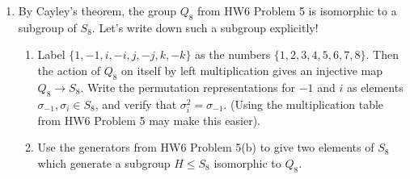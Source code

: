 \documentclass[11pt]{article}
\newtheorem*{hint}{Hint}
\begin{document}
\begin{enumerate}
{\begin{enumerate}
\[\begin{array}{c}
      \text{such that }N\le H
    \end{array}\right\}
    \Longleftrightarrow
    \left\{
    \begin{array}{c}
      \text{Subgroups}\\
      \overline{H}\le G/N
    \end{array}
    \right\}
    \]
  \item This bijection satisfies certain properties.  First let's establish some notation. Let $H,K\in G$ be two subgroups containing $N$, and denote the corresponding subgroups of $G/N$ by $\overline H$ and $\overline K$.  Prove the following properties.
    \begin{enumerate}
      \item $H\le K$ if and only if $\overline H\le\overline K$.
      \item $H\unlhd K$ if and only if $\overline H\unlhd\overline K$.
      \item $\overline{H\cap K} = \overline H\cap\overline K$
      \item $\overline{\langle H,K\rangle} = \langle\overline H,\overline K\rangle$.
    \end{enumerate}
    \begin{hint}
      You can do (iii) and (iv) directly, but if you want to be really slick use that the intersection of two subgroups is the largest subgroup contained in both, (and the dual notion for the subgroup generated by two subgroups).  Notice that this means that being the intersection of two subgroups (or generated by two subgroups) is a condition on the lattice of $G$ (or $G/N$).  Then the result should easily follow from part (i).
    \end{hint}
  \end{enumerate}
  }
    \item By Cayley's theorem, the group $Q_8$ from HW6 Problem 5 is isomorphic to a subgroup of $S_8$.  Let's write down such a subgroup explicitly!
  \begin{enumerate}
    \item Label $\{1,-1,i,-i,j,-j,k,-k\}$ as the numbers $\{1,2,3,4,5,6,7,8\}$. Then the action of $Q_8$ on itself by left multiplication gives an injective map $Q_8\to S_8$.  Write the permutation representations for $-1$ and $i$ as elements $\sigma_{-1},\sigma_i\in S_8$, and verify that $\sigma_i^2 = \sigma_{-1}$.  (Using the multiplication table from HW6 Problem 5 may make this easier).
    \item Use the generators from HW6 Problem 5(b) to give two elements of $S_8$ which generate a subgroup $H\le S_8$ isomorphic to $Q_8$.

\end{enumerate}
\end{enumerate}
\end{document}
